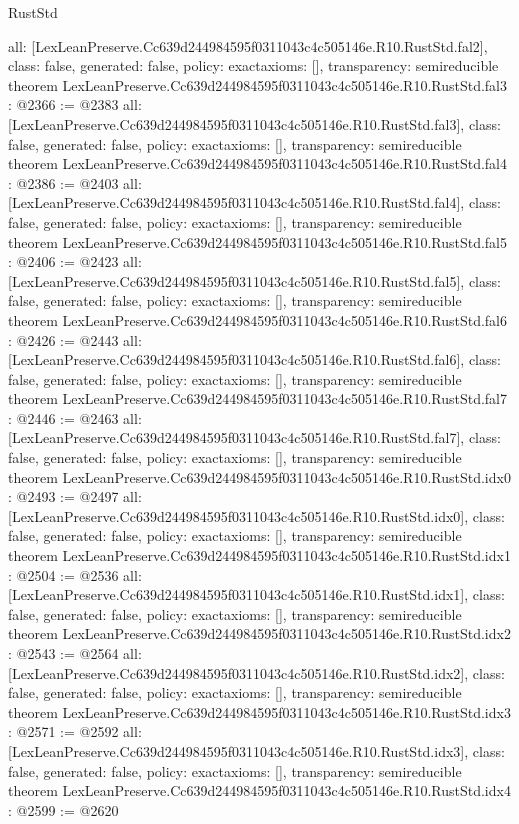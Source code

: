 \begin{lexlean}{RustStd}
\begin{coremodule}
{  all: [LexLeanPreserve.Cc639d244984595f0311043c4c505146e.R10.RustStd.fal2],
  class: false,
  generated: false,
  policy: exact{axioms: []},
  transparency: semireducible
}
theorem LexLeanPreserve.Cc639d244984595f0311043c4c505146e.R10.RustStd.fal3 : @2366 := @2383 {
  all: [LexLeanPreserve.Cc639d244984595f0311043c4c505146e.R10.RustStd.fal3],
  class: false,
  generated: false,
  policy: exact{axioms: []},
  transparency: semireducible
}
theorem LexLeanPreserve.Cc639d244984595f0311043c4c505146e.R10.RustStd.fal4 : @2386 := @2403 {
  all: [LexLeanPreserve.Cc639d244984595f0311043c4c505146e.R10.RustStd.fal4],
  class: false,
  generated: false,
  policy: exact{axioms: []},
  transparency: semireducible
}
theorem LexLeanPreserve.Cc639d244984595f0311043c4c505146e.R10.RustStd.fal5 : @2406 := @2423 {
  all: [LexLeanPreserve.Cc639d244984595f0311043c4c505146e.R10.RustStd.fal5],
  class: false,
  generated: false,
  policy: exact{axioms: []},
  transparency: semireducible
}
theorem LexLeanPreserve.Cc639d244984595f0311043c4c505146e.R10.RustStd.fal6 : @2426 := @2443 {
  all: [LexLeanPreserve.Cc639d244984595f0311043c4c505146e.R10.RustStd.fal6],
  class: false,
  generated: false,
  policy: exact{axioms: []},
  transparency: semireducible
}
theorem LexLeanPreserve.Cc639d244984595f0311043c4c505146e.R10.RustStd.fal7 : @2446 := @2463 {
  all: [LexLeanPreserve.Cc639d244984595f0311043c4c505146e.R10.RustStd.fal7],
  class: false,
  generated: false,
  policy: exact{axioms: []},
  transparency: semireducible
}
theorem LexLeanPreserve.Cc639d244984595f0311043c4c505146e.R10.RustStd.idx0 : @2493 := @2497 {
  all: [LexLeanPreserve.Cc639d244984595f0311043c4c505146e.R10.RustStd.idx0],
  class: false,
  generated: false,
  policy: exact{axioms: []},
  transparency: semireducible
}
theorem LexLeanPreserve.Cc639d244984595f0311043c4c505146e.R10.RustStd.idx1 : @2504 := @2536 {
  all: [LexLeanPreserve.Cc639d244984595f0311043c4c505146e.R10.RustStd.idx1],
  class: false,
  generated: false,
  policy: exact{axioms: []},
  transparency: semireducible
}
theorem LexLeanPreserve.Cc639d244984595f0311043c4c505146e.R10.RustStd.idx2 : @2543 := @2564 {
  all: [LexLeanPreserve.Cc639d244984595f0311043c4c505146e.R10.RustStd.idx2],
  class: false,
  generated: false,
  policy: exact{axioms: []},
  transparency: semireducible
}
theorem LexLeanPreserve.Cc639d244984595f0311043c4c505146e.R10.RustStd.idx3 : @2571 := @2592 {
  all: [LexLeanPreserve.Cc639d244984595f0311043c4c505146e.R10.RustStd.idx3],
  class: false,
  generated: false,
  policy: exact{axioms: []},
  transparency: semireducible
}
theorem LexLeanPreserve.Cc639d244984595f0311043c4c505146e.R10.RustStd.idx4 : @2599 := @2620 {
}
\end{coremodule}
\end{lexlean}
